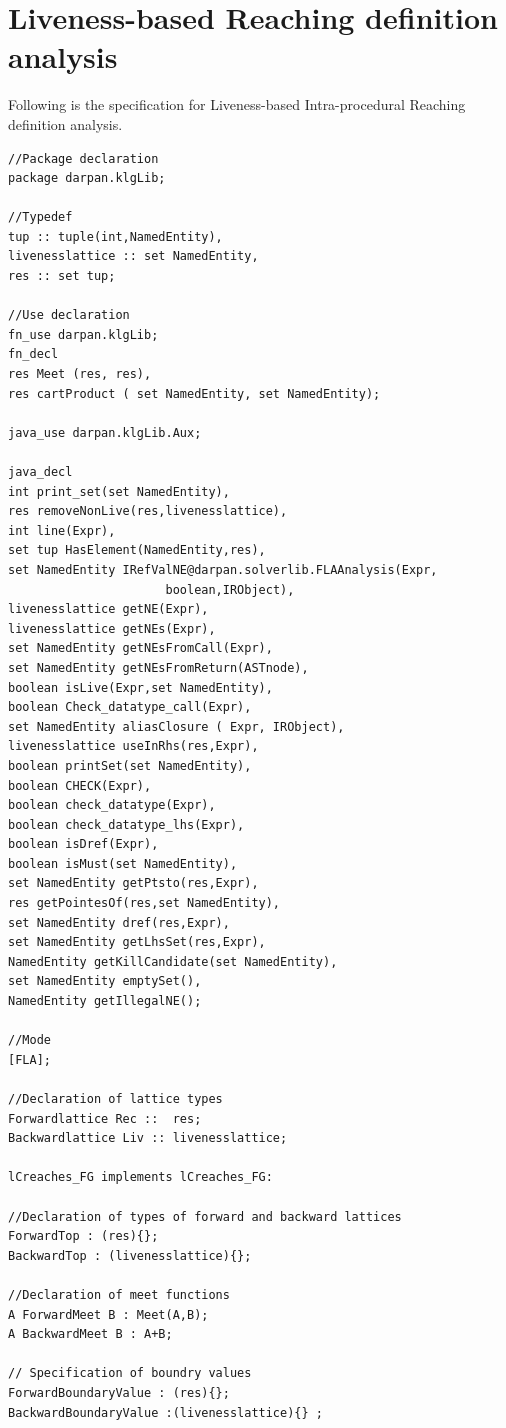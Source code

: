 \documentclass[11pt,a4paper,openright]{report}
\begin{document}
\section{Liveness-based Reaching definition analysis}
Following is the specification for Liveness-based Intra-procedural Reaching definition analysis.
\begin{lstlisting}
//Package declaration
package darpan.klgLib;

//Typedef
tup :: tuple(int,NamedEntity),
livenesslattice :: set NamedEntity,
res :: set tup;

//Use declaration
fn_use darpan.klgLib;
fn_decl
res Meet (res, res),
res cartProduct ( set NamedEntity, set NamedEntity);

java_use darpan.klgLib.Aux;

java_decl
int print_set(set NamedEntity),
res removeNonLive(res,livenesslattice),
int line(Expr),
set tup HasElement(NamedEntity,res),
set NamedEntity IRefValNE@darpan.solverlib.FLAAnalysis(Expr,
					  boolean,IRObject),
livenesslattice getNE(Expr),
livenesslattice getNEs(Expr),
set NamedEntity getNEsFromCall(Expr),
set NamedEntity getNEsFromReturn(ASTnode),
boolean isLive(Expr,set NamedEntity),
boolean Check_datatype_call(Expr),
set NamedEntity aliasClosure ( Expr, IRObject),
livenesslattice useInRhs(res,Expr),
boolean printSet(set NamedEntity),
boolean CHECK(Expr),
boolean check_datatype(Expr),
boolean check_datatype_lhs(Expr),
boolean isDref(Expr),
boolean isMust(set NamedEntity),
set NamedEntity getPtsto(res,Expr),
res getPointesOf(res,set NamedEntity),
set NamedEntity dref(res,Expr),
set NamedEntity getLhsSet(res,Expr),
NamedEntity getKillCandidate(set NamedEntity),
set NamedEntity emptySet(),
NamedEntity getIllegalNE();

//Mode
[FLA];

//Declaration of lattice types
Forwardlattice Rec ::  res;
Backwardlattice Liv :: livenesslattice;

lCreaches_FG implements lCreaches_FG:

//Declaration of types of forward and backward lattices
ForwardTop : (res){};
BackwardTop : (livenesslattice){};

//Declaration of meet functions
A ForwardMeet B : Meet(A,B);
A BackwardMeet B : A+B;

// Specification of boundry values
ForwardBoundaryValue : (res){};
BackwardBoundaryValue :(livenesslattice){} ;


\end{lstlisting}
\end{document}
